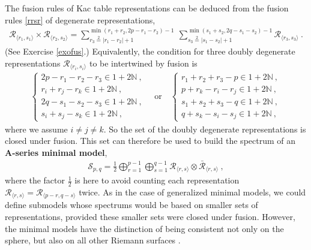 \documentclass[12pt, a4paper, notitlepage, twoside]{report}
\numberwithin{equation}{section}
\theoremstyle{break}
\begin{document}
The fusion rules of Kac table representations can be deduced from the fusion rules \eqref{rrsr} of degenerate representations, 
\begin{align}
  \boxed{\mathcal{R}_{\langle r_1,s_1 \rangle} \times \mathcal{R}_{\langle r_2,s_2 \rangle} = \sum_{r_3\overset{2}{=}|r_1-r_2|+1}^{\min(r_1+r_2,2p-r_1-r_2)-1}\ \sum_{s_3\overset{2}{=}|s_1-s_2|+1}^{\min(s_1+s_2,2q-s_1-s_2)-1} \mathcal{R}_{\langle r_3,s_3 \rangle}}\ .
\label{rrmm}
\end{align}
(See Exercise \ref{exofus}.) Equivalently, 
the condition for three doubly degenerate representations $\mathcal{R}_{\langle r_i,s_i \rangle}$ to be intertwined by fusion is 
\begin{align}
 \left\{\begin{array}{l}  2p-r_1-r_2-r_3\in 1+2{\mathbb{N}}\ , \\
 r_i+r_j-r_k \in 1 + 2{\mathbb{N}}\ , \\
2q-s_1-s_2-s_3\in 1+2{\mathbb{N}}\ , \\
 s_i+s_j-s_k \in 1 + 2{\mathbb{N}}\ , \end{array}\right.  
\quad \text{or} \quad
 \left\{\begin{array}{l}  r_1+r_2+r_3-p\in 1+2{\mathbb{N}}\ , \\
 p+r_k-r_i-r_j\in 1+2{\mathbb{N}} \ , \\
s_1+s_2+s_3-q\in 1+2{\mathbb{N}}\ , \\
 q+s_k-s_i-s_j\in 1+2{\mathbb{N}} \ ,\end{array}\right. 
 \label{mmfr}
\end{align}
where we assume $i\neq j\neq k$.
So the set of the doubly degenerate representations is closed under fusion.
This set can therefore be used to build the spectrum of an \textbf{A-series minimal model},
\begin{align}
 \boxed{ \mathcal{S}_{p,q} = \frac12 \bigoplus_{r=1}^{p-1} \bigoplus_{s=1}^{q-1} \mathcal{R}_{\langle r,s \rangle}\otimes \bar{\mathcal{R}}_{\langle r,s \rangle} } \ ,
\label{smin}
\end{align}
where the factor $\frac12$ is here to avoid counting each representation $\mathcal{R}_{\langle r,s \rangle}=\mathcal{R}_{\langle p-r,q-s \rangle}$ twice.
As in the case of generalized minimal models, we could define submodels whose spectrums would be based on smaller sets of representations, provided these smaller sets were closed under fusion.
However, the minimal models have the distinction of being consistent not only on the sphere, but also on all other Riemann surfaces \cite{fms97}.
\end{document}
